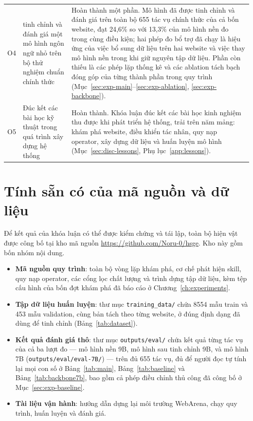 \begin{longtable}{@{}L{1.0cm} L{4.6cm} L{7.4cm}@{}}
  O4 &
  tinh chỉnh và đánh giá một mô hình ngôn ngữ nhỏ trên bộ thử nghiệm chuẩn chính thức &
  Hoàn thành một phần. Mô hình đã được tinh chỉnh và đánh giá trên toàn bộ
  655 tác vụ chính thức của cả bốn website, đạt 24{,}6\% so với 13{,}3\% của mô
  hình nền đo trong cùng điều kiện; hai phép đo bổ trợ đã chạy là hiệu ứng của
  việc bổ sung dữ liệu trên hai website và việc thay mô hình nền trong khi giữ
  nguyên tập dữ liệu. Phần còn thiếu là các phép lặp thống kê và các ablation
  tách bạch đóng góp của từng thành phần trong quy trình
  (Mục~\ref{sec:exp-main}--\ref{sec:exp-ablation}, \ref{sec:exp-backbone}). \\

  \addlinespace

  O5 &
  Đúc kết các bài học kỹ thuật trong quá trình xây dựng hệ thống &
  Hoàn thành. Khóa luận đúc kết các bài học kinh nghiệm thu được khi
  phát triển hệ thống, trải trên năm mảng: khám phá website, điều khiển tác
  nhân, quy nạp operator, xây dựng dữ liệu và huấn luyện mô hình
  (Mục~\ref{sec:disc-lessons}, Phụ lục~\ref{app:lessons}). \\
\end{longtable}
\normalsize

\section{Tính sẵn có của mã nguồn và dữ liệu}
\label{sec:conc-availability}

Để kết quả của khóa luận có thể được kiểm chứng và tái lập, toàn bộ hiện vật
được công bố tại kho mã nguồn \url{https://github.com/Noru-0/hsge}. Kho này
gồm bốn nhóm nội dung.

\begin{itemize}
  \item \textbf{Mã nguồn quy trình}: toàn bộ vòng lặp khám phá, cơ chế phát
    hiện skill, quy nạp operator, các cổng lọc chất lượng và trình dựng tập
    dữ liệu, kèm tệp cấu hình của bốn đợt khám phá đã báo cáo ở
    Chương~\ref{ch:experiments}.
  \item \textbf{Tập dữ liệu huấn luyện}: thư mục \texttt{training\_data/}
    chứa 8554 mẫu train và 453 mẫu validation, cùng bản tách theo từng
    website, ở đúng định dạng đã dùng để tinh chỉnh
    (Bảng~\ref{tab:dataset}).
  \item \textbf{Kết quả đánh giá thô}: thư mục \texttt{outputs/eval/} chứa
    kết quả từng tác vụ của cả ba lượt đo --- mô hình nền 9B, mô hình sau
    tinh chỉnh 9B, và mô hình 7B (\texttt{outputs/eval/eval-7B/}) --- trên đủ
    655 tác vụ, đủ để người đọc tự tính lại mọi con số ở Bảng~\ref{tab:main},
    Bảng~\ref{tab:baseline} và Bảng~\ref{tab:backbone7b}, bao gồm cả phép
    điều chỉnh thủ công đã công bố ở Mục~\ref{sec:exp-baseline}.
  \item \textbf{Tài liệu vận hành}: hướng dẫn dựng lại môi trường WebArena,
    chạy quy trình, huấn luyện và đánh giá.
\end{itemize}


